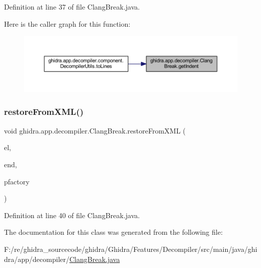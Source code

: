 Definition at line 37 of file Clang\+Break.\+java.

Here is the caller graph for this function\+:
\nopagebreak
\begin{figure}[H]
\begin{center}
\leavevmode
\includegraphics[width=350pt]{classghidra_1_1app_1_1decompiler_1_1_clang_break_a03b1a3db4c98f658cc5f4d6293d3292d_icgraph}
\end{center}
\end{figure}
\mbox{\label{classghidra_1_1app_1_1decompiler_1_1_clang_break_a4f89221822a1f22c24f3832466df5f69}} 
\subsubsection{\texorpdfstring{restoreFromXML()}{restoreFromXML()}}
{\footnotesize\ttfamily void ghidra.\+app.\+decompiler.\+Clang\+Break.\+restore\+From\+X\+ML (\begin{DoxyParamCaption}\item[{Xml\+Element}]{el,  }\item[{Xml\+Element}]{end,  }\item[{Pcode\+Factory}]{pfactory }\end{DoxyParamCaption})\hspace{0.3cm}{\ttfamily [inline]}}



Definition at line 40 of file Clang\+Break.\+java.



The documentation for this class was generated from the following file\+:\begin{DoxyCompactItemize}
\item 
F\+:/re/ghidra\+\_\+sourcecode/ghidra/\+Ghidra/\+Features/\+Decompiler/src/main/java/ghidra/app/decompiler/\mbox{\hyperlink{_clang_break_8java}{Clang\+Break.\+java}}\end{DoxyCompactItemize}
